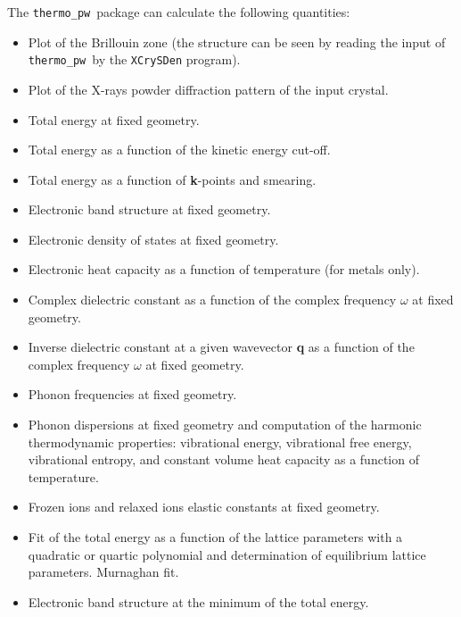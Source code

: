 \documentclass[12pt,a4paper]{article}
\def\thermo{\texttt{thermo\_pw}}
\begin{document}
The \thermo\ package can calculate the following quantities:
\begin{itemize}
\item Plot of the Brillouin zone (the structure can be seen by reading the
input of \thermo\ by the \texttt{XCrySDen} program).

\item Plot of the X-rays powder diffraction pattern of the input crystal.

\item Total energy at fixed geometry.

\item Total energy as a function of the kinetic energy cut-off.

\item Total energy as a function of {\bf k}-points and smearing.

\item Electronic band structure at fixed geometry.

\item Electronic density of states at fixed geometry.

\item Electronic heat capacity as a function of temperature (for metals only).

\item Complex dielectric constant as a function of the complex
frequency $\omega$ at fixed geometry.

\item Inverse dielectric constant at a given wavevector {\bf q} as a function 
of the complex frequency $\omega$ at fixed geometry.

\item Phonon frequencies at fixed geometry.

\item Phonon dispersions at fixed geometry and computation of the harmonic
thermodynamic properties: vibrational energy, vibrational free energy,
vibrational entropy, and constant volume heat capacity as a function of
temperature.

\item Frozen ions and relaxed ions elastic constants at fixed geometry.

\item Fit of the total energy as a function of the lattice parameters with
a quadratic or quartic polynomial and determination of equilibrium lattice 
parameters. Murnaghan fit.

\item Electronic band structure at the minimum of the total energy.


\end{itemize}
\end{document}
